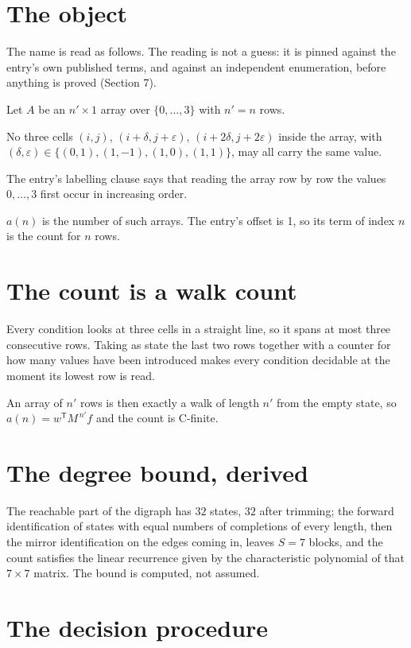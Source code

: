 \documentclass[11pt]{article}
\theoremstyle{definition}
\begin{document}
\section{The object}

The name is read as follows. The reading is not a guess: it is pinned against the entry's own published terms, and against an independent enumeration, before anything is proved (Section 7).

Let $A$ be an $n' \times 1$ array over $\{0,\dots,3\}$ with $n' = n$ rows.

No three cells $(i,j)$, $(i{+}\delta,j{+}\varepsilon)$, $(i{+}2\delta,j{+}2\varepsilon)$ inside the array, with $(\delta,\varepsilon) \in \{(0,1), (1,-1), (1,0), (1,1)\}$, may all carry the same value.

The entry's labelling clause says that reading the array row by row the values $0,\dots,3$ first occur in increasing order.

$a(n)$ is the number of such arrays. The entry's offset is 1, so its term of index $n$ is the count for $n$ rows.

\section{The count is a walk count}

Every condition looks at three cells in a straight line, so it spans at most three consecutive rows. Taking as state the last two rows together with a counter for how many values have been introduced makes every condition decidable at the moment its lowest row is read.

An array of $n'$ rows is then exactly a walk of length $n'$ from the empty state, so $a(n) = w^{\mathsf T}M^{\,n'}f$ and the count is C-finite.

\section{The degree bound, derived}

The reachable part of the digraph has $32$ states, $32$ after trimming; the forward identification of states with equal numbers of completions of every length, then the mirror identification on the edges coming in, leaves $S = 7$ blocks, and the count satisfies the linear recurrence given by the characteristic polynomial of that $7\times7$ matrix. The bound is computed, not assumed.

\section{The decision procedure}
\end{document}
